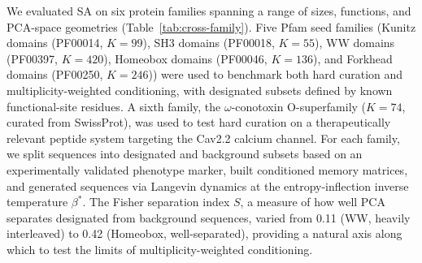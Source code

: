 
We evaluated SA on six protein families spanning a range of sizes, functions, and PCA-space
geometries (Table~\ref{tab:cross-family}). Five Pfam seed families (Kunitz domains (PF00014,
$K=99$), SH3 domains (PF00018, $K=55$), WW domains (PF00397, $K=420$), Homeobox domains
(PF00046, $K=136$), and Forkhead domains (PF00250, $K=246$)) were used to benchmark both hard
curation and multiplicity-weighted conditioning, with designated subsets defined by known
functional-site residues. A sixth family, the $\omega$-conotoxin O-superfamily ($K=74$, curated
from SwissProt), was used to test hard curation on a therapeutically relevant peptide system
targeting the Cav2.2 calcium channel. For each family, we split sequences into designated and
background subsets based on an experimentally validated phenotype marker, built conditioned
memory matrices, and generated sequences via Langevin dynamics at the entropy-inflection inverse
temperature $\beta^{*}$. The Fisher separation index $S$, a measure of how well PCA separates
designated from background sequences, varied from 0.11 (WW, heavily interleaved) to 0.42
(Homeobox, well-separated), providing a natural axis along which to test the limits of
multiplicity-weighted conditioning.

